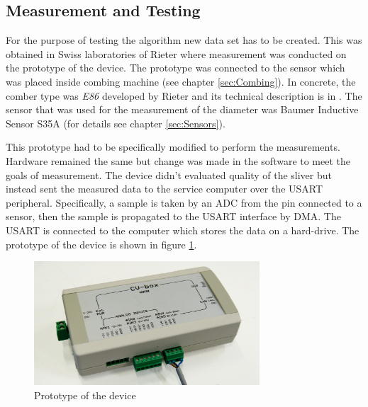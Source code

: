 \documentclass[twoside]{ctuthesis}
\theoremstyle{plain}
\theoremstyle{definition}
\theoremstyle{note}
\begin{document}
\subsection{Measurement and Testing}
\label{sec:MeasurmentAndTesting}
For the purpose of testing the algorithm new data set has to be created. This was obtained in Swiss laboratories of Rieter where measurement was conducted on the prototype of the device. The prototype was connected to the sensor which was placed inside combing machine (see chapter \ref{sec:Combing}). In concrete, the comber type was \textit{E86} developed by Rieter and its technical description is in \cite{cite:ComberE86}. The sensor that was used for the measurement of the diameter was Baumer Inductive Sensor S35A (for details see chapter \ref{sec:Sensors}).

This prototype had to be specifically modified to perform the measurements. Hardware remained the same but change was made in the software to meet the goals of measurement. The device didn't evaluated quality of the sliver but instead sent the measured data to the service computer over the USART peripheral. Specifically, a sample is taken by an ADC from the pin connected to a sensor, then the sample is propagated to the USART interface by DMA. The USART is connected to the computer which stores the data on a hard-drive. The prototype of the device is shown in figure \ref{fig:cvBox_covered}.
\begin{figure}[h]
	\centering
	\includegraphics[width=0.75\textwidth]{cvBox_covered.jpg}
	\caption{Prototype of the device}
	\label{fig:cvBox_covered}
\end{figure}
\end{document}

